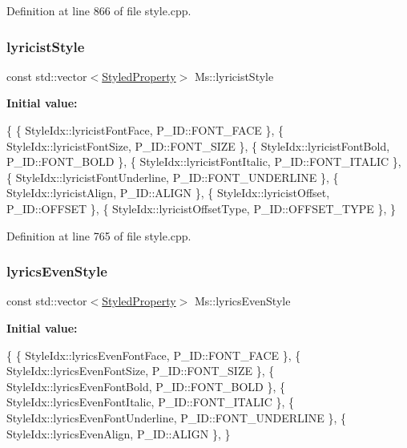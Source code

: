 Definition at line 866 of file style.\+cpp.

\mbox{\label{namespace_ms_afd03c24760ed59e860fba4ecafb7df40}} 
\subsubsection{\texorpdfstring{lyricist\+Style}{lyricistStyle}}
{\footnotesize\ttfamily const std\+::vector$<$\hyperlink{struct_ms_1_1_styled_property}{Styled\+Property}$>$ Ms\+::lyricist\+Style}

{\bfseries Initial value\+:}
\begin{DoxyCode}
\{
      \{ StyleIdx::lyricistFontFace,                   P\_ID::FONT\_FACE              \},
      \{ StyleIdx::lyricistFontSize,                   P\_ID::FONT\_SIZE              \},
      \{ StyleIdx::lyricistFontBold,                   P\_ID::FONT\_BOLD              \},
      \{ StyleIdx::lyricistFontItalic,                 P\_ID::FONT\_ITALIC            \},
      \{ StyleIdx::lyricistFontUnderline,              P\_ID::FONT\_UNDERLINE         \},
      \{ StyleIdx::lyricistAlign,                      P\_ID::ALIGN                  \},
      \{ StyleIdx::lyricistOffset,                     P\_ID::OFFSET                 \},
      \{ StyleIdx::lyricistOffsetType,                 P\_ID::OFFSET\_TYPE            \},
      \}
\end{DoxyCode}


Definition at line 765 of file style.\+cpp.

\mbox{\label{namespace_ms_a561800170b2c31c2eaa5bb86427977da}} 
\subsubsection{\texorpdfstring{lyrics\+Even\+Style}{lyricsEvenStyle}}
{\footnotesize\ttfamily const std\+::vector$<$\hyperlink{struct_ms_1_1_styled_property}{Styled\+Property}$>$ Ms\+::lyrics\+Even\+Style}

{\bfseries Initial value\+:}
\begin{DoxyCode}
\{
      \{ StyleIdx::lyricsEvenFontFace,                 P\_ID::FONT\_FACE              \},
      \{ StyleIdx::lyricsEvenFontSize,                 P\_ID::FONT\_SIZE              \},
      \{ StyleIdx::lyricsEvenFontBold,                 P\_ID::FONT\_BOLD              \},
      \{ StyleIdx::lyricsEvenFontItalic,               P\_ID::FONT\_ITALIC            \},
      \{ StyleIdx::lyricsEvenFontUnderline,            P\_ID::FONT\_UNDERLINE         \},
      \{ StyleIdx::lyricsEvenAlign,                    P\_ID::ALIGN                  \},
      \}
\end{DoxyCode}


